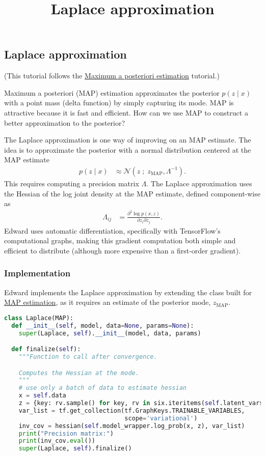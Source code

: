 \title{Laplace approximation}

\subsection{Laplace approximation}

(This tutorial follows the
\href{tut_MAP}{Maximum a posteriori estimation} tutorial.)

Maximum a posteriori (MAP) estimation approximates the posterior $p(z \mid x)$
with a point mass (delta function) by simply capturing its mode. MAP is
attractive because it is fast and efficient. How can we use MAP to construct a
better approximation to the posterior?

The Laplace approximation is one way of improving on an MAP estimate. The idea
is to approximate the posterior with a normal distribution centered at the MAP
estimate
\begin{align*}
  p(z \mid x)
  &\approx
  \mathcal{N}(z\;;\; z_\text{MAP}, \Lambda^{-1}).
\end{align*}
This requires computing a precision matrix $\Lambda$. The Laplace approximation
uses the Hessian of the log joint density at the MAP estimate,
defined component-wise as
\begin{align*}
  \Lambda_{ij}
  &=
  \frac{\partial^2 \log p(x, z)}{\partial z_i \partial z_j}.
\end{align*}
Edward uses automatic differentiation, specifically with TensorFlow's
computational graphs, making this gradient computation both simple and
efficient to distribute (although more expensive than a first-order
gradient).

\subsubsection{Implementation}

Edward implements the Laplace approximation by extending the class built for
\href{tut_MAP}{MAP estimation}, as it requires an estimate of the
posterior mode, $z_\text{MAP}$.

\begin{lstlisting}[language=Python]
class Laplace(MAP):
  def __init__(self, model, data=None, params=None):
    super(Laplace, self).__init__(model, data, params)

  def finalize(self):
    """Function to call after convergence.

    Computes the Hessian at the mode.
    """
    # use only a batch of data to estimate hessian
    x = self.data
    z = {key: rv.sample() for key, rv in six.iteritems(self.latent_vars)}
    var_list = tf.get_collection(tf.GraphKeys.TRAINABLE_VARIABLES,
                                 scope='variational')
    inv_cov = hessian(self.model_wrapper.log_prob(x, z), var_list)
    print("Precision matrix:")
    print(inv_cov.eval())
    super(Laplace, self).finalize()
\end{lstlisting}

